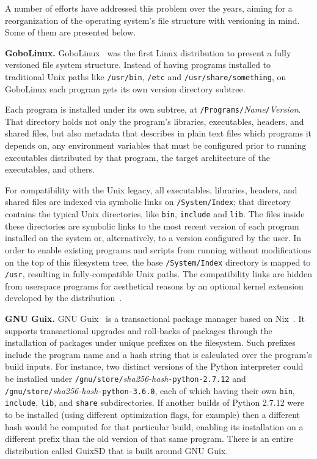 \documentclass[sigplan, anonymous, 10pt]{acmart}
\begin{document}
A number of efforts have addressed this problem over the years, aiming for a reorganization
of the operating system's file structure with versioning in mind. Some of them are presented below.

\textbf{GoboLinux.}
GoboLinux~\cite{GoboLinux} was the first Linux distribution to present a fully versioned
file system structure. Instead of having programs installed to traditional Unix paths
like \texttt{/usr/bin}, \texttt{/etc} and \texttt{/usr/share/something}, on GoboLinux
each program gets its own version directory subtree.

Each program is installed under its own subtree, at \texttt{/Programs/}\textit{Name}\texttt{/}\textit{Version}. That directory holds not
only the program's libraries, executables, headers, and shared files, but also metadata
that describes in plain text files which programs it depends on,
any environment variables that must be configured prior to running executables distributed
by that program, the target architecture of the executables, and others.

For compatibility with the Unix legacy, all executables, libraries, headers, and shared
files are indexed via symbolic links on \texttt{/System/Index};
that directory contains the typical Unix directories, like \texttt{bin}, \texttt{include}
and \texttt{lib}. The files inside these directories are symbolic links to the
most recent version of each program installed on the system or, alternatively, to a version
configured by the user. In order to enable existing programs and scripts from running
without modifications on the top of this filesystem tree, the base \texttt{/System/Index}
directory is mapped to \texttt{/usr}, resulting in fully-compatible Unix paths.
The compatibility links are hidden from userspace programs for aesthetical reasons
by an optional kernel extension developed by the distribution~\cite{GoboHide}.

\textbf{GNU Guix.}
GNU Guix~\cite{courtes2013:guix} is a transactional package manager based on Nix~\cite{dolstra2004:nix}.
It supports transactional upgrades and
roll-backs of packages through the installation of packages under unique prefixes on the filesystem.
Such prefixes include the program name and a hash string that is calculated over the program's
build inputs. For instance, two distinct versions of the Python interpreter could be installed
under \texttt{/gnu/store/}\textit{sha256-hash}\texttt{-python-2.7.12} and \texttt{/gnu/store/}\textit{sha256-hash}\texttt{-python-3.6.0},
each of which having their own \texttt{bin}, \texttt{include}, \texttt{lib}, and \texttt{share}
subdirectories. If another builds of Python 2.7.12 were to be installed (using different optimization
flags, for example) then a different hash would be computed for that particular build, enabling its
installation on a different prefix than the old version of that same program. There is an entire
distribution called GuixSD that is built around GNU Guix.
\end{document}
